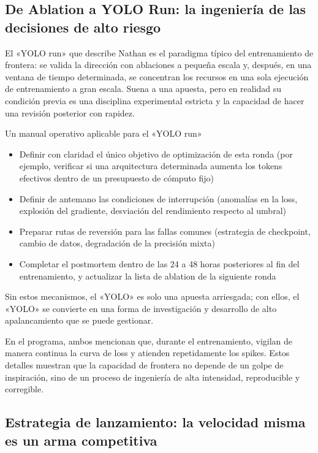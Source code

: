 \subsection{De Ablation a YOLO Run: la ingeniería de las decisiones de alto riesgo}

El «YOLO run» que describe Nathan es el paradigma típico del entrenamiento de frontera: se valida la dirección con ablaciones a pequeña escala y, después, en una ventana de tiempo determinada, se concentran los recursos en una sola ejecución de entrenamiento a gran escala. Suena a una apuesta, pero en realidad su condición previa es una disciplina experimental estricta y la capacidad de hacer una revisión posterior con rapidez.

\begin{knowledgebox}{Un manual operativo aplicable para el «YOLO run»}
\begin{itemize}
    \item Definir con claridad el único objetivo de optimización de esta ronda (por ejemplo, verificar si una arquitectura determinada aumenta los tokens efectivos dentro de un presupuesto de cómputo fijo)
    \item Definir de antemano las condiciones de interrupción (anomalías en la loss, explosión del gradiente, desviación del rendimiento respecto al umbral)
    \item Preparar rutas de reversión para las fallas comunes (estrategia de checkpoint, cambio de datos, degradación de la precisión mixta)
    \item Completar el postmortem dentro de las 24 a 48 horas posteriores al fin del entrenamiento, y actualizar la lista de ablation de la siguiente ronda
\end{itemize}

Sin estos mecanismos, el «YOLO» es solo una apuesta arriesgada; con ellos, el «YOLO» se convierte en una forma de investigación y desarrollo de alto apalancamiento que se puede gestionar.
\end{knowledgebox}

En el programa, ambos mencionan que, durante el entrenamiento, vigilan de manera continua la curva de loss y atienden repetidamente los spikes. Estos detalles muestran que la capacidad de frontera no depende de un golpe de inspiración, sino de un proceso de ingeniería de alta intensidad, reproducible y corregible.

\subsection{Estrategia de lanzamiento: la velocidad misma es un arma competitiva}

